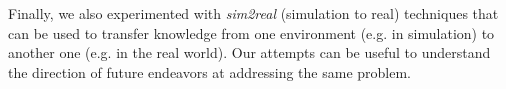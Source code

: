 
Finally, we also experimented with \textit{sim2real} (simulation to real) techniques that can be used to transfer knowledge from one environment (e.g. in simulation) to another one (e.g. in the real world). Our attempts can be useful to understand the direction of future endeavors at addressing the same problem.

